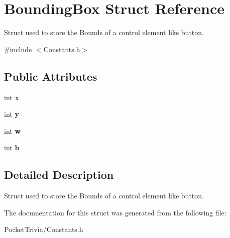 \hypertarget{struct_bounding_box}{}\section{Bounding\+Box Struct Reference}
\label{struct_bounding_box}


Struct used to store the Bounds of a control element like button.  




{\ttfamily \#include $<$Constants.\+h$>$}

\subsection*{Public Attributes}
\begin{DoxyCompactItemize}
\item 
\mbox{\label{struct_bounding_box_a04995560a0a588ba37532fa81e23ed53}} 
int {\bfseries x}
\item 
\mbox{\label{struct_bounding_box_a0d892e85763e5211be6eba8f2c35aec7}} 
int {\bfseries y}
\item 
\mbox{\label{struct_bounding_box_a3c652d17a47d825bb3435e44a0ea6fb8}} 
int {\bfseries w}
\item 
\mbox{\label{struct_bounding_box_a78df27e8ccc98e27dd72cd30b4637416}} 
int {\bfseries h}
\end{DoxyCompactItemize}


\subsection{Detailed Description}
Struct used to store the Bounds of a control element like button. 



The documentation for this struct was generated from the following file\+:\begin{DoxyCompactItemize}
\item 
Pocket\+Trivia/Constants.\+h\end{DoxyCompactItemize}
